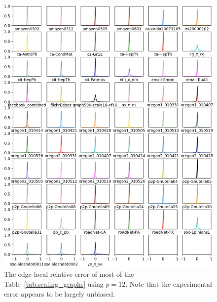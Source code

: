 \documentclass[10]{article}
\begin{document}
\begin{figure}
	\centerline{\includegraphics[width=1.0\columnwidth]{distn_edge_total}}
	\caption{The edge-local relative error of most of the  Table~\ref{tab:scaling_graphs} using $p=12$.
	Note that the experimental error appears to be largely unbiased.
	\label{fig:distn_edge}}
\end{figure}
\end{document}
